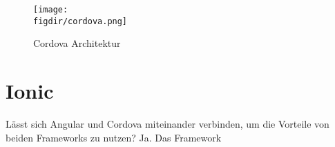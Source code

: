 \begin{figure}[htb]
\centering
\caption{Cordova Architektur}
\label{fig:cordova}
\texttt{[image: \\figdir/cordova.png]}
\end{figure}

\section{Ionic}

Lässt sich Angular und Cordova miteinander verbinden, um die Vorteile von beiden Frameworks zu nutzen? Ja. Das Framework











